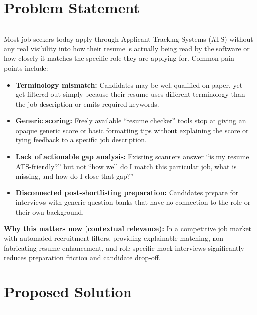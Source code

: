 \documentclass[11pt,a4paper]{article}
\newcommand{\BvrSectionRule}{%
  \par\nobreak\vspace{0.25em}%
  \noindent\rule{\linewidth}{0.4pt}%
  \par\nobreak\vspace{0.4em}%
}
\begin{document}
\section{Problem Statement}
\BvrSectionRule
Most job seekers today apply through Applicant Tracking
Systems (ATS) without any real visibility into how their
resume is actually being read by the software or how closely
it matches the specific role they are applying for. Common
pain points include:
\begin{itemize}[leftmargin=0.7cm]
    \item \textbf{Terminology mismatch:} Candidates may be well qualified on paper, yet get filtered out simply because their resume uses different terminology than the job description or omits required keywords.
    \item \textbf{Generic scoring:} Freely available ``resume checker'' tools stop at giving an opaque generic score or basic formatting tips without explaining the score or tying feedback to a specific job description.
    \item \textbf{Lack of actionable gap analysis:} Existing scanners answer ``is my resume ATS-friendly?'' but not ``how well do I match this particular job, what is missing, and how do I close that gap?''
    \item \textbf{Disconnected post-shortlisting preparation:} Candidates prepare for interviews with generic question banks that have no connection to the role or their own background.
\end{itemize}

\textbf{Why this matters now (contextual relevance):} In a
competitive job market with automated recruitment filters,
providing explainable matching, non-fabricating resume
enhancement, and role-specific mock interviews significantly
reduces preparation friction and candidate drop-off.

\section{Proposed Solution %
}
\BvrSectionRule
\end{document}
